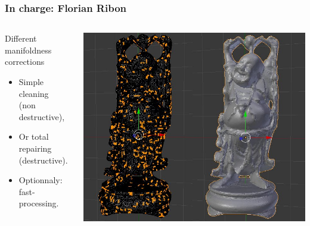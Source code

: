 \documentclass{beamer}
\begin{document}
\begin{frame}
	\frametitle{In charge: Florian Ribon}

    \begin{columns}[t]
  	\begin{column}{5cm}
        \begin{block}{Different manifoldness corrections}
		    \begin{itemize}
			    \item Simple cleaning\\\small(non destructive),
			    \item Or total repairing\\\small(destructive).
			    \item Optionnaly: fast-processing.
		    \end{itemize}
        \end{block}
    \end{column}

    \begin{column}{6cm}
        \begin{center}
		    \includegraphics[height=.7\textheight]{repair}
	    \end{center}
    \end{column}

    \end{columns}
\end{frame}
\end{document}
